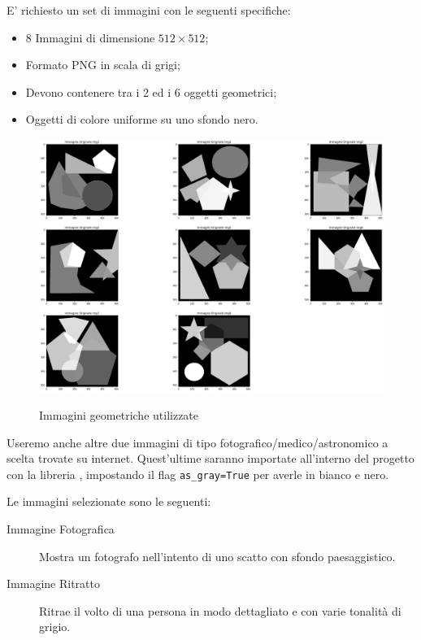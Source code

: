 E' richiesto un set di immagini con le seguenti specifiche: 
\begin{itemize}
    \item 8 Immagini di dimensione $512 \times 512$;
    \item Formato PNG in scala di grigi;
    \item Devono contenere tra i 2 ed i 6 oggetti geometrici;
    \item Oggetti di colore uniforme su uno sfondo nero.
\end{itemize}
\begin{figure}[h]
    \centering
    \includegraphics[width=0.5\linewidth]{./imgRel/dataset.png}\label{fig:datasetgeometriche}
    \caption{Immagini geometriche utilizzate}
\end{figure}
Useremo anche altre due immagini di tipo fotografico/medico/astronomico a scelta trovate su internet.
Quest'ultime saranno importate all'interno del progetto con la libreria , impostando il flag \verb|as_gray=True| per averle in bianco e nero.

Le immagini selezionate sono le seguenti:
\begin{description}
    \item[Immagine Fotografica] Mostra un fotografo nell'intento di uno scatto con sfondo paesaggistico.
    \item[Immagine Ritratto] Ritrae il volto di una persona in modo dettagliato e con varie tonalità di grigio.
\end{description}

